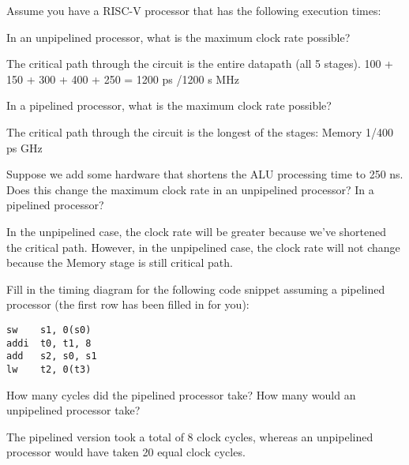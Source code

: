 \begin{blocksection}
\question
Assume you have a RISC-V processor that has the following execution times:

\begin{parts}
\item In an unpipelined processor, what is the maximum clock rate possible?

\begin{solution}
The critical path through the circuit is the entire datapath (all 5 stages).
100 + 150 + 300 + 400 + 250 = 1200 ps /1200 s  MHz
\end{solution}

\item In a pipelined processor, what is the maximum clock rate possible?

\begin{solution}
The critical path through the circuit is the longest of the stages: Memory
1/400 ps  GHz
\end{solution}

\item Suppose we add some hardware that shortens the ALU processing time to 250 ns. Does this change the maximum clock rate in an unpipelined processor? In a pipelined processor?

\begin{solution}
In the unpipelined case, the clock rate will be greater because we’ve shortened the critical path. However, in the unpipelined case, the clock rate will not change because the Memory stage is still critical path.
\end{solution}

\end{parts}

\question Fill in the timing diagram for the following code snippet assuming a pipelined processor (the first row has been filled in for you):

\begin{verbatim}
sw	  s1, 0(s0)
addi  t0, t1, 8
add   s2, s0, s1
lw	  t2, 0(t3)
\end{verbatim}

How many cycles did the pipelined processor take? How many would an unpipelined processor take?

\begin{solution}
The pipelined version took a total of 8 clock cycles, whereas an unpipelined processor would have taken 20 equal clock cycles.
\end{solution}

\end{blocksection}